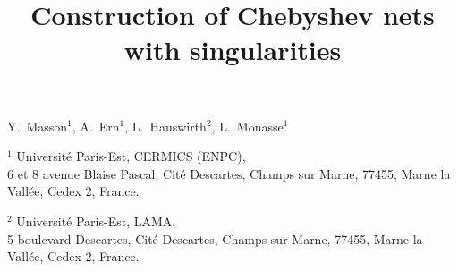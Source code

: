 \documentclass{article}
\theoremstyle{remark}
\theoremstyle{prpart}
\begin{document}
\title{Construction of Chebyshev nets with singularities}
\maketitle

\begin{center}{Y.~Masson$^{\textrm{1}}$,
    A.~Ern$^{\textrm{1}}$, L.~Hauswirth$^{\textrm{2}}$,
    L.~Monasse$^{\textrm{1}}$} \end{center}
\begin{center}
  $^{\textrm{1}}$ Universit\'e Paris-Est, CERMICS (ENPC), \\
  6 et 8 avenue Blaise Pascal, Cit\'e Descartes, Champs sur Marne, 77455, Marne la Vall\'ee, Cedex 2, France.
\end{center}
\begin{center}
  $^{\textrm{2}}$ Universit\'e Paris-Est, LAMA, \\
  5 boulevard Descartes, Cit\'e Descartes, Champs sur Marne, 77455, Marne la Vall\'ee, Cedex 2, France.
\end{center}


\end{document}
